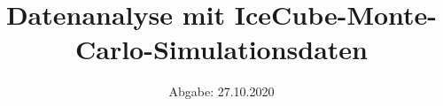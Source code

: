 

\subject{Lehrstuhlversuch im SS2020}
\title{Datenanalyse mit IceCube-Monte-Carlo-Simulationsdaten}
\date{%
  Abgabe: 27.10.2020
}



\maketitle
\thispagestyle{empty}
\tableofcontents
\newpage







\newpage
%


